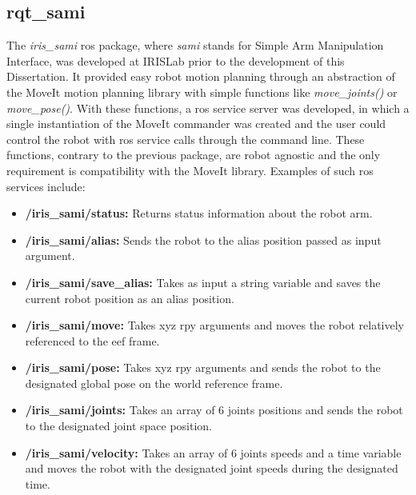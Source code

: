 \subsection{rqt\_sami}

\par The \textit{iris\_sami} \ac{ros} package, where \textit{sami} stands for Simple Arm Manipulation Interface, was developed at IRISLab prior to the development of this Dissertation. It provided easy robot motion planning through an abstraction of the MoveIt motion planning library with simple functions like \textit{move\_joints()} or \textit{move\_pose()}. With these functions, a \ac{ros} service server was developed, in which a single instantiation of the MoveIt commander was created and the user could control the robot with \ac{ros} service calls through the command line. These functions, contrary to the previous package, are robot agnostic and the only requirement is compatibility with the MoveIt library. Examples of such \ac{ros} services include:


\begin{itemize}
    \item \textbf{/iris\_sami/status: } Returns status information about the robot arm.
    \item \textbf{/iris\_sami/alias: } Sends the robot to the alias position passed as input argument.
    \item \textbf{/iris\_sami/save\_alias: } Takes as input a string variable and saves the current robot position as an alias position.
    \item \textbf{/iris\_sami/move: } Takes \ac{xyz} \ac{rpy} arguments and moves the robot relatively referenced to the \ac{eef} frame.
    \item \textbf{/iris\_sami/pose: } Takes \ac{xyz} \ac{rpy} arguments and sends the robot to the designated global pose on the world reference frame.
    \item \textbf{/iris\_sami/joints: } Takes an array of 6 joints positions and sends the robot to the designated joint space position.
    \item \textbf{/iris\_sami/velocity: } Takes an array of 6 joints speeds and a time variable and moves the robot with the designated joint speeds during the designated time.
\end{itemize}

